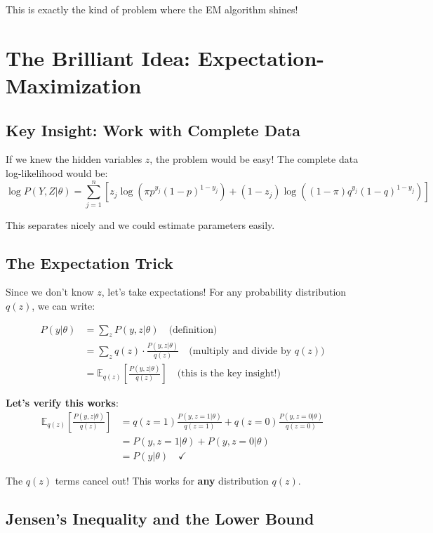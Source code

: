 \begin{notechapter}
This is exactly the kind of problem where the EM algorithm shines!

\section{The Brilliant Idea: Expectation-Maximization}

\subsection{Key Insight: Work with Complete Data}

If we knew the hidden variables $z$, the problem would be easy! The complete data log-likelihood would be:
\[
\log P(Y, Z|\theta) = \sum_{j=1}^n \left[z_j \log(\pi p^{y_j}(1-p)^{1-y_j}) + (1-z_j) \log((1-\pi) q^{y_j}(1-q)^{1-y_j})\right]
\]

This separates nicely and we could estimate parameters easily.

\subsection{The Expectation Trick}

Since we don't know $z$, let's take expectations! For any probability distribution $q(z)$, we can write:

\begin{align*}
P(y|\theta) &= \sum_z P(y,z|\theta) \quad \text{(definition)} \\
&= \sum_z q(z) \cdot \frac{P(y,z|\theta)}{q(z)} \quad \text{(multiply and divide by $q(z)$)} \\
&= \mathbb{E}_{q(z)}\left[\frac{P(y,z|\theta)}{q(z)}\right] \quad \text{(this is the key insight!)}
\end{align*}

\textbf{Let's verify this works}:
\begin{align*}
\mathbb{E}_{q(z)}\left[\frac{P(y,z|\theta)}{q(z)}\right] 
&= q(z=1)\frac{P(y,z=1|\theta)}{q(z=1)} + q(z=0)\frac{P(y,z=0|\theta)}{q(z=0)} \\
&= P(y,z=1|\theta) + P(y,z=0|\theta) \\
&= P(y|\theta) \quad \text{✓}
\end{align*}

The $q(z)$ terms cancel out! This works for \textbf{any} distribution $q(z)$.

\subsection{Jensen's Inequality and the Lower Bound}


\end{notechapter}
